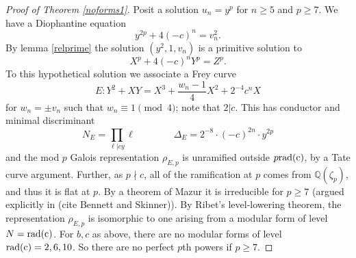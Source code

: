 \documentclass[12pt]{amsart}
\theoremstyle{definition}
\def\Q{{\mathbb Q}}
\newcommand{\rad}{\rm rad}
\newcommand{\notdiv}{\nmid}
\begin{document}
\begin{proof}[Proof of Theorem \ref{noforms1}]
Posit a solution $u_n = y^p$ for $n \geq 5$ and $p \geq 7$.  We have a Diophantine equation
\[ y^{2p} + 4(-c)^n = v_n^2. \] 
By lemma \ref{relprime} the solution $(y^2, 1, v_n)$ is a primitive solution to 
\[ X^p + 4(-c)^n Y^p = Z^p.\]
To this hypothetical solution we associate a Frey curve
\[E: Y^2 + XY = X^3 + \frac{w_n - 1}{4} X^2 + 2^{-4}c^nX \]
for $w_n = \pm v_n$ such that $w_n \equiv 1 \pmod{4}$; note that $2|c$.  This has conductor and minimal discriminant
\begin{equation}\label{conddis1} N_E =\prod_{\ell | cy} \ell  \qquad \qquad \Delta_E = 2^{-8} \cdot (-c)^{2n} \cdot y^{2p} \end{equation}
and the mod $p$ Galois representation $\rho_{E,p}$ is unramified outside $p\rad{(c)}$, by a Tate curve argument.  Further, as $p \notdiv c$, all of the ramification at $p$ comes from $\Q(\zeta_p)$, and thus it is flat at $p$.  By a theorem of Mazur it is irreducible for $p \geq 7$ (argued explicitly in (cite Bennett and Skinner)).  By Ribet's level-lowering theorem, the representation $\rho_{E,p}$ is isomorphic to one arising from a modular form of level $N = \rad(c)$.  For $b,c$ as above, there are no modular forms of level $\rad(c)=2,6,10$.  So there are no perfect $p$th powers if $p \geq 7$.


\end{proof}
\end{document}
